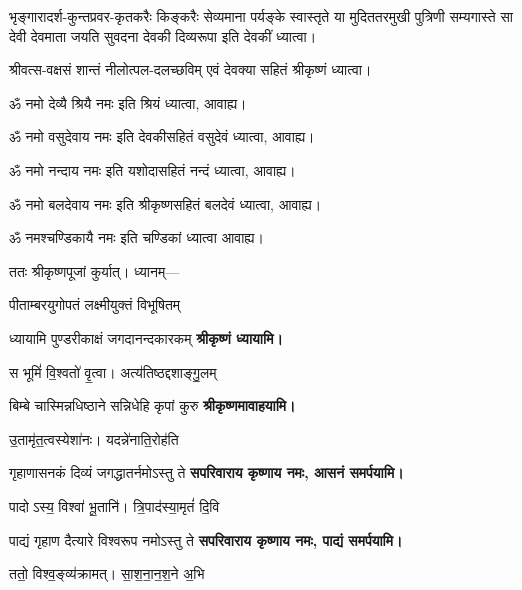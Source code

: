 \begin{center}

{भृङ्गारादर्श-कुन्तप्रवर-कृतकरैः किङ्करैः सेव्यमाना}
{पर्यङ्के स्वास्तृते या मुदिततरमुखी पुत्रिणी सम्यगास्ते}
{सा देवी देवमाता जयति सुवदना देवकी दिव्यरूपा} 
इति देवकीं ध्यात्वा।

{श्रीवत्स-वक्षसं शान्तं नीलोत्पल-दलच्छविम्}
एवं देवक्या सहितं श्रीकृष्णं ध्यात्वा।

ॐ नमो देव्यै श्रियै नमः इति श्रियं ध्यात्वा, आवाह्य।

ॐ नमो वसुदेवाय नमः इति देवकीसहितं वसुदेवं ध्यात्वा, आवाह्य।

ॐ नमो नन्दाय नमः इति यशोदासहितं नन्दं ध्यात्वा, आवाह्य।

ॐ नमो बलदेवाय नमः इति श्रीकृष्णसहितं बलदेवं ध्यात्वा, आवाह्य।

ॐ नमश्चण्डिकायै नमः इति चण्डिकां ध्यात्वा आवाह्य।

ततः श्रीकृष्णपूजां कुर्यात्। ध्यानम्—

\renewcommand{\devAya}{सपरिवाराय कृष्णाय नमः,}
\medskip

{पीताम्बरयुगोपतं लक्ष्मीयुक्तं विभूषितम्}

{ध्यायामि पुण्डरीकाक्षं जगदानन्दकारकम्}
\medskip
\textbf{श्रीकृष्णं ध्यायामि।}

{स भूमिं॑ वि॒श्वतो॑ वृ॒त्वा। अत्य॑तिष्ठद्दशाङ्गु॒लम्}

{बिम्बे चास्मिन्नधिष्ठाने सन्निधेहि कृपां कुरु}
\textbf{श्रीकृष्णमावाहयामि।}
\medskip

{उ॒तामृ॑त॒त्वस्येशा॑नः। यदन्ने॑नाति॒रोह॑ति}

{गृहाणासनकं दिव्यं जगद्धातर्नमोऽस्तु ते}
\textbf{\devAya{} आसनं समर्पयामि।}
\medskip

{पादोऽस्य॒ विश्वा॑ भू॒तानि॑। त्रि॒पाद॑स्या॒मृतं॑ दि॒वि}

{पाद्यं गृहाण दैत्यारे विश्वरूप नमोऽस्तु ते}
\textbf{\devAya{} पाद्यं समर्पयामि।}
\medskip

{ततो॒ विश्व॒ङ्व्य॑क्रामत्। सा॒श॒ना॒न॒श॒ने अ॒भि}


\end{center}

